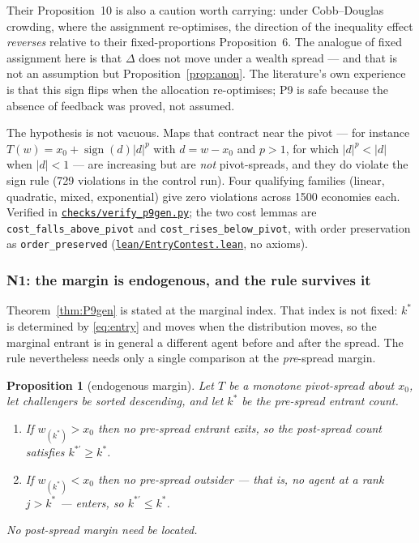 \documentclass[11pt]{article}
\newtheorem{proposition}{Proposition}
\newcommand{\file}[1]{\href{run:#1}{\texttt{#1}}}
\begin{document}
Their Proposition~10 is also a caution worth carrying: under Cobb--Douglas
crowding, where the assignment re-optimises, the direction of the inequality
effect \emph{reverses} relative to their fixed-proportions Proposition~6. The
analogue of fixed assignment here is that $\Delta$ does not move under a wealth
spread --- and that is not an assumption but Proposition~\ref{prop:anon}. The
literature's own experience is that this sign flips when the allocation
re-optimises; P9 is safe because the absence of feedback was proved, not
assumed.

The hypothesis is not vacuous. Maps that contract near the pivot --- for
instance $T(w)=x_0+\operatorname{sign}(d)|d|^{p}$ with $d=w-x_0$ and
$p>1$, for which $|d|^p<|d|$ when $|d|<1$ --- are increasing but are
\emph{not} pivot-spreads, and they do violate the sign rule (729
violations in the control run). Four qualifying families (linear,
quadratic, mixed, exponential) give zero violations across 1500 economies
each. Verified in \file{checks/verify\_p9gen.py}; the two cost lemmas are
\texttt{cost\_falls\_above\_pivot} and \texttt{cost\_rises\_below\_pivot},
with order preservation as \texttt{order\_preserved}
(\file{lean/EntryContest.lean}, no axioms).

\subsubsection{N1: the margin is endogenous, and the rule survives it}
\label{prop:endog}

Theorem~\ref{thm:P9gen} is stated at the marginal index. That index is not
fixed: $k^*$ is determined by \eqref{eq:entry} and moves when the
distribution moves, so the marginal entrant is in general a different agent
before and after the spread. The rule nevertheless needs only a single
comparison at the \emph{pre}-spread margin.

\begin{proposition}[endogenous margin]
\label{prop:endogenous}
Let $T$ be a monotone pivot-spread about $x_0$, let challengers be sorted
descending, and let $k^*$ be the pre-spread entrant count.
\begin{enumerate}
\item If $w_{(k^*)}>x_0$ then no pre-spread entrant exits, so the post-spread
  count satisfies $k^{*\prime}\ge k^*$.
\item If $w_{(k^*)}<x_0$ then no pre-spread outsider --- that is, no agent at
  a rank $j>k^*$ --- enters, so $k^{*\prime}\le k^*$.
\end{enumerate}
No post-spread margin need be located.
\end{proposition}
\end{document}
